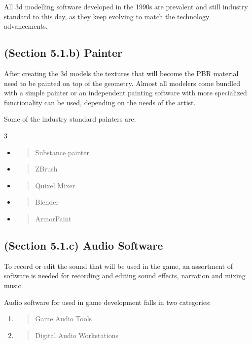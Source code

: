 \documentclass[a4paper,one side,12pt]{book}
\begin{document}
All 3d modelling software developed in the 1990s are prevalent and still
industry standard to this day, as they keep evolving to match the
technology advancements.


\subsection{(Section 5.1.b) Painter}

After creating the 3d models the textures that will become the PBR
material need to be painted on top of the geometry. Almost all modelers
come bundled with a simple painter or an independent painting software
with more specialized functionality can be used, depending on the needs
of the artist.

Some of the industry standard painters are:
\begin{multicols}{3}
  
\begin{itemize}
\item
  \begin{quote}
  Substance painter
  \end{quote}
\item
  \begin{quote}
  ZBrush
  \end{quote}
\item
  \begin{quote}
  Quixel Mixer
  \end{quote}
\item
  \begin{quote}
  Blender
  \end{quote}
\item
  \begin{quote}
  ArmorPaint
  \end{quote}
\end{itemize}
\end{multicols}

\subsection{(Section 5.1.c) Audio Software}

To record or edit the sound that will be used in the game, an assortment
of software is needed for recording and editing sound effects, narration
and mixing music.

Audio software for used in game development falls in two categories:

\begin{enumerate}
\def\labelenumi{\arabic{enumi}.}
\item
  \begin{quote}
  Game Audio Tools
  \end{quote}
\item
  \begin{quote}
  Digital Audio Workstations
  \end{quote}
\end{enumerate}
\end{document}
